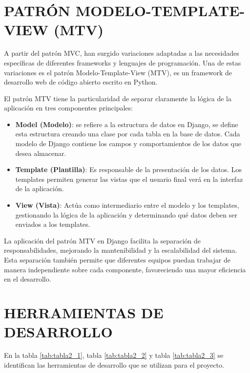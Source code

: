 	\section{PATRÓN MODELO-TEMPLATE-VIEW (MTV)}
		
		A partir del patrón MVC, han surgido variaciones adaptadas a las necesidades específicas de diferentes frameworks y lenguajes de programación. Una de estas variaciones es el patrón Modelo-Template-View (MTV), es un framework de desarrollo web de código abierto escrito en Python.
		
		El patrón MTV tiene la particularidad de separar claramente la lógica de la aplicación en tres componentes principales:
		
		\begin{itemize}[label=$\bullet$, left=0cm, labelsep = 1.05cm, topsep = 0pt, parsep = 0pt]
			\item \textbf{Model (Modelo)}: se refiere a la estructura de datos en Django, se define esta estructura creando una clase por cada tabla en la base de datos. Cada modelo de Django contiene los campos y comportamientos de los datos que desea almacenar.
			\item \textbf{Template (Plantilla)}: Es responsable de la presentación de los datos. Los templates permiten generar las vistas que el usuario final verá en la interfaz de la aplicación.
			\item \textbf{View (Vista)}: Actúa como intermediario entre el modelo y los templates, gestionando la lógica de la aplicación y determinando qué datos deben ser enviados a los templates.
		\end{itemize}
		
		La aplicación del patrón MTV en Django facilita la separación de responsabilidades, mejorando la mantenibilidad y la escalabilidad del sistema. Esta separación también permite que diferentes equipos puedan trabajar de manera independiente sobre cada componente, favoreciendo una mayor eficiencia en el desarrollo.		
	
	\section{HERRAMIENTAS DE DESARROLLO}
		En la tabla \ref{tab:tabla2_1}, tabla \ref{tab:tabla2_2} y tabla \ref{tab:tabla2_3} se identifican las herramientas de desarrollo que se utilizan para el proyecto.
		
